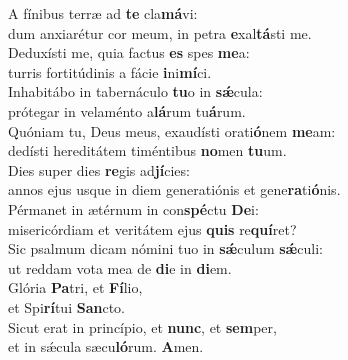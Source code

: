 \evenverse A fínibus terræ ad \textbf{te} cla\textbf{má}vi:~\*\\
\evenverse dum anxiarétur cor meum, in petra \textbf{e}xal\textbf{tá}sti me.\\
\oddverse Deduxísti me, quia factus \textbf{es} spes \textbf{me}a:~\*\\
\oddverse turris fortitúdinis a fácie \textbf{i}ni\textbf{mí}ci.\\
\evenverse Inhabitábo in tabernáculo \textbf{tu}o in \textbf{sǽ}cula:~\*\\
\evenverse prótegar in velaménto a\textbf{lá}rum tu\textbf{á}rum.\\
\oddverse Quóniam tu, Deus meus, exaudísti orati\textbf{ó}nem \textbf{me}am:~\*\\
\oddverse dedísti hereditátem timéntibus \textbf{no}men \textbf{tu}um.\\
\evenverse Dies super dies \textbf{re}gis ad\textbf{jí}cies:~\*\\
\evenverse annos ejus usque in diem generatiónis et gene\textbf{ra}ti\textbf{ó}nis.\\
\oddverse Pérmanet in ætérnum in con\textbf{spé}ctu \textbf{De}i:~\*\\
\oddverse misericórdiam et veritátem ejus \textbf{quis} re\textbf{quí}ret?\\
\evenverse Sic psalmum dicam nómini tuo in \textbf{sǽ}culum \textbf{sǽ}culi:~\*\\
\evenverse ut reddam vota mea de \textbf{di}e in \textbf{di}em.\\
\oddverse Glória \textbf{Pa}tri, et \textbf{Fí}lio,~\*\\
\oddverse et Spi\textbf{rí}tui \textbf{San}cto.\\
\evenverse Sicut erat in princípio, et \textbf{nunc}, et \textbf{sem}per,~\*\\
\evenverse et in sǽcula sæcu\textbf{ló}rum. \textbf{A}men.\\

